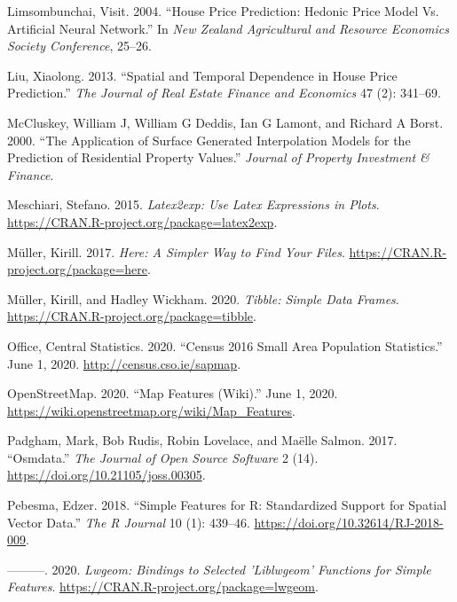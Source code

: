 \documentclass[conference,final,]{IEEEtran}
\newlength{\cslhangindent}
\newenvironment{cslreferences}%
  {\setlength{\parindent}{0pt}%
  \everypar{\setlength{\hangindent}{\cslhangindent}}\ignorespaces}%
  {\par}
\begin{document}
\begin{cslreferences}
\leavevmode\hypertarget{ref-limsombunchai2004house}{}%
Limsombunchai, Visit. 2004. ``House Price Prediction: Hedonic Price Model Vs. Artificial Neural Network.'' In \emph{New Zealand Agricultural and Resource Economics Society Conference}, 25--26.

\leavevmode\hypertarget{ref-liu2013spatial}{}%
Liu, Xiaolong. 2013. ``Spatial and Temporal Dependence in House Price Prediction.'' \emph{The Journal of Real Estate Finance and Economics} 47 (2): 341--69.

\leavevmode\hypertarget{ref-mccluskey2000application}{}%
McCluskey, William J, William G Deddis, Ian G Lamont, and Richard A Borst. 2000. ``The Application of Surface Generated Interpolation Models for the Prediction of Residential Property Values.'' \emph{Journal of Property Investment \& Finance}.

\leavevmode\hypertarget{ref-R-latex2exp}{}%
Meschiari, Stefano. 2015. \emph{Latex2exp: Use Latex Expressions in Plots}. \url{https://CRAN.R-project.org/package=latex2exp}.

\leavevmode\hypertarget{ref-R-here}{}%
Müller, Kirill. 2017. \emph{Here: A Simpler Way to Find Your Files}. \url{https://CRAN.R-project.org/package=here}.

\leavevmode\hypertarget{ref-R-tibble}{}%
Müller, Kirill, and Hadley Wickham. 2020. \emph{Tibble: Simple Data Frames}. \url{https://CRAN.R-project.org/package=tibble}.

\leavevmode\hypertarget{ref-cso2020}{}%
Office, Central Statistics. 2020. ``Census 2016 Small Area Population Statistics.'' June 1, 2020. \url{http://census.cso.ie/sapmap}.

\leavevmode\hypertarget{ref-openstreetmap2020}{}%
OpenStreetMap. 2020. ``Map Features (Wiki).'' June 1, 2020. \url{https://wiki.openstreetmap.org/wiki/Map_Features}.

\leavevmode\hypertarget{ref-R-osmdata}{}%
Padgham, Mark, Bob Rudis, Robin Lovelace, and Maëlle Salmon. 2017. ``Osmdata.'' \emph{The Journal of Open Source Software} 2 (14). \url{https://doi.org/10.21105/joss.00305}.

\leavevmode\hypertarget{ref-R-sf}{}%
Pebesma, Edzer. 2018. ``Simple Features for R: Standardized Support for Spatial Vector Data.'' \emph{The R Journal} 10 (1): 439--46. \url{https://doi.org/10.32614/RJ-2018-009}.

\leavevmode\hypertarget{ref-R-lwgeom}{}%
---------. 2020. \emph{Lwgeom: Bindings to Selected 'Liblwgeom' Functions for Simple Features}. \url{https://CRAN.R-project.org/package=lwgeom}.


\end{cslreferences}
\end{document}
